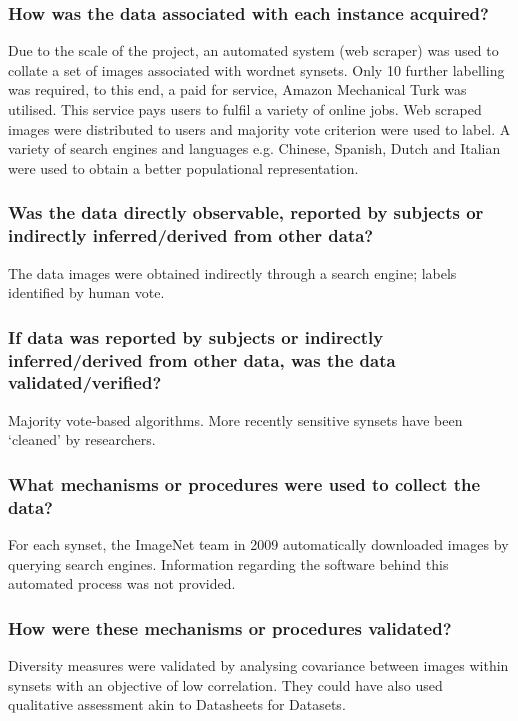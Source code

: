 \documentclass[a4paper,12pt]{article}
\begin{document}
\subsubsection*{How was the data associated with each instance acquired?}

Due to the scale of the project, an automated system (web scraper) was used to collate a set of
images associated with wordnet synsets. Only 10%
further labelling was required, to this end, a paid for service, Amazon Mechanical Turk was utilised.
This service pays users to fulfil a variety of online jobs. Web scraped images were distributed to
users and majority vote criterion were used to label. A variety of search engines and languages e.g.
Chinese, Spanish, Dutch and Italian were used to obtain a better populational representation.
\subsubsection*{Was the data directly observable, reported by subjects or indirectly inferred/derived from other data?}

The data images were obtained indirectly through a search engine; labels identified by human vote.

\subsubsection*{If data was reported by subjects or indirectly inferred/derived from other data, was the data
  validated/verified?}

Majority vote-based algorithms. More recently sensitive synsets have been ‘cleaned’ by researchers.

\subsubsection*{What mechanisms or procedures were used to collect the data?}

For each synset, the ImageNet team in 2009 automatically downloaded images by querying search
engines. Information regarding the software behind this automated process was not provided.


\subsubsection*{How were these mechanisms or procedures validated?}

Diversity measures were validated by analysing covariance between images within synsets with an
objective of low correlation. They could have also used qualitative assessment akin to Datasheets for
Datasets.
\end{document}
